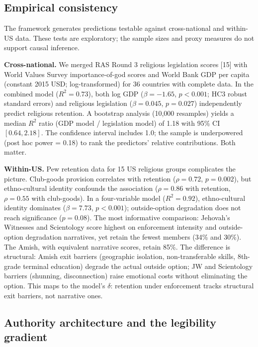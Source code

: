 \documentclass[12pt]{article}
\begin{document}
%

\subsection{Empirical consistency}

The framework generates predictions testable against cross-national and
within-US data. These tests are exploratory; the sample sizes and proxy
measures do not support causal inference.

\textbf{Cross-national.} We merged RAS Round 3 religious legislation
scores [15] with World Values Survey importance-of-god scores and World
Bank GDP per capita (constant 2015 USD; log-transformed) for 36
countries with complete data. In the combined model ($R^2 = 0.73$), both
log GDP ($\beta = -1.65$, $p < 0.001$; HC3 robust standard errors) and
religious legislation ($\beta = 0.045$, $p = 0.027$) independently
predict religious retention. A bootstrap analysis (10,000 resamples)
yields a median $R^2$ ratio (GDP model / legislation model) of 1.18 with
95\% CI $[0.64, 2.18]$. The confidence interval includes 1.0; the
sample is underpowered (post hoc power = 0.18) to rank the predictors'
relative contributions. Both matter.

\textbf{Within-US.} Pew retention data for 15 US religious groups
complicates the picture. Club-goods provision correlates with retention
($\rho = 0.72$, $p = 0.002$), but ethno-cultural identity confounds the
association ($\rho = 0.86$ with retention, $\rho = 0.55$ with
club-goods). In a four-variable model ($R^2 = 0.92$), ethno-cultural
identity dominates ($\beta = 7.73$, $p < 0.001$); outside-option
degradation does not reach significance ($p = 0.08$). The most
informative comparison: Jehovah's Witnesses and Scientology score highest
on enforcement intensity and outside-option degradation narratives, yet
retain the fewest members (34\% and 30\%). The Amish, with equivalent
narrative scores, retain 85\%. The difference is structural: Amish exit
barriers (geographic isolation, non-transferable skills, 8th-grade
terminal education) degrade the actual outside option; JW and Scientology
barriers (shunning, disconnection) raise emotional costs without
eliminating the option. This maps to the model's $\delta$: retention
under enforcement tracks structural exit barriers, not narrative ones.

\subsection{Authority architecture and the legibility gradient}
\end{document}
